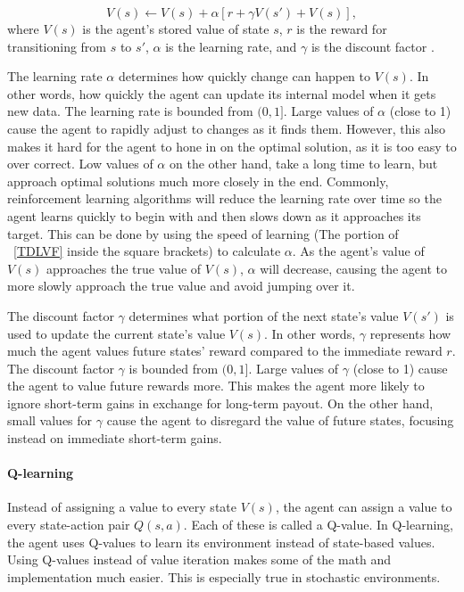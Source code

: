 \documentclass[letterpaper]{article} %
\begin{document}
\begin{equation}
V(s) \leftarrow V(s) + \alpha \left[r + \gamma V(s') + V(s)\right],
\label{TDLVF}
\end{equation}
where $V(s)$ is the agent's stored value of state $s$, $r$ is the reward for transitioning from $s$ to $s'$, $\alpha$ is the learning rate, and $\gamma$ is the discount factor \cite{Sutton1998}.

The learning rate $\alpha$ determines how quickly change can happen to $V(s)$. In other words, how quickly the agent can update its internal model when it gets new data. The learning rate is bounded from $(0,1]$. Large values of $\alpha$ (close to 1) cause the agent to rapidly adjust to changes as it finds them. However, this also makes it hard for the agent to hone in on the optimal solution, as it is too easy to over correct. Low values of $\alpha$ on the other hand, take a long time to learn, but approach optimal solutions much more closely in the end. Commonly, reinforcement learning algorithms will reduce the learning rate over time so the agent learns quickly to begin with and then slows down as it approaches its target. This can be done by using the speed of learning (The portion of \figurename~\ref{TDLVF} inside the square brackets) to calculate $\alpha$. As the agent's value of $V(s)$ approaches the true value of $V(s)$, $\alpha$ will decrease, causing the agent to more slowly approach the true value and avoid jumping over it.

The discount factor $\gamma$ determines what portion of the next state's value $V(s')$ is used to update the current state's value $V(s)$. In other words, $\gamma$ represents how much the agent values future states' reward compared to the immediate reward $r$. The discount factor $\gamma$ is bounded from $(0,1]$. Large values of $\gamma$ (close to 1) cause the agent to value future rewards more. This makes the agent more likely to ignore short-term gains in exchange for long-term payout. On the other hand, small values for $\gamma$ cause the agent to disregard the value of future states, focusing instead on immediate short-term gains.
\paragraph{Q-learning}
Instead of assigning a value to every state $V(s)$, the agent can assign a value to every state-action pair $Q(s,a)$. Each of these is called a Q-value. In Q-learning, the agent uses Q-values to learn its environment instead of state-based values. Using Q-values instead of value iteration makes some of the math and implementation much easier. This is especially true in stochastic environments.
\end{document}
